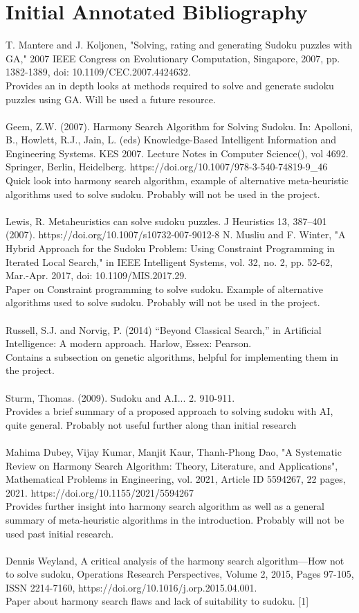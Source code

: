 \documentclass[a4paper,10pt]{article}
\begin{document}
\section*{Initial Annotated Bibliography}
T. Mantere and J. Koljonen, "Solving, rating and generating Sudoku puzzles with GA," 2007 IEEE Congress on Evolutionary Computation, Singapore, 2007, pp. 1382-1389, doi: 10.1109/CEC.2007.4424632. \\Provides an in depth looks at methods required to solve and generate sudoku puzzles using GA. Will be used a future resource.  \\ \\
Geem, Z.W. (2007). Harmony Search Algorithm for Solving Sudoku. In: Apolloni, B., Howlett, R.J., Jain, L. (eds) Knowledge-Based Intelligent Information and Engineering Systems. KES 2007. Lecture Notes in Computer Science(), vol 4692. Springer, Berlin, Heidelberg. https://doi.org/10.1007/978-3-540-74819-9\_46  \\Quick look into harmony search algorithm, example of alternative meta-heuristic algorithms used to solve sudoku. Probably will not be used in the project. \\ \\
Lewis, R. Metaheuristics can solve sudoku puzzles. J Heuristics 13, 387–401 (2007). https://doi.org/10.1007/s10732-007-9012-8
N. Musliu and F. Winter, "A Hybrid Approach for the Sudoku Problem: Using Constraint Programming in Iterated Local Search," in IEEE Intelligent Systems, vol. 32, no. 2, pp. 52-62, Mar.-Apr. 2017, doi: 10.1109/MIS.2017.29. \\Paper on Constraint programming to solve sudoku. Example of alternative algorithms used to solve sudoku. Probably will not be used in the project. \\ \\
Russell, S.J. and Norvig, P. (2014) “Beyond Classical Search,” in Artificial Intelligence: A modern approach. Harlow, Essex: Pearson. \\ Contains a subsection on genetic algorithms, helpful for implementing them in the project. \\ \\
Sturm, Thomas. (2009). Sudoku and A.I... 2. 910-911. \\ Provides a brief summary of a proposed approach to solving sudoku with AI, quite general. Probably not useful further along than initial research \\ \\
Mahima Dubey, Vijay Kumar, Manjit Kaur, Thanh-Phong Dao, "A Systematic Review on Harmony Search Algorithm: Theory, Literature, and Applications", Mathematical Problems in Engineering, vol. 2021, Article ID 5594267, 22 pages, 2021. https://doi.org/10.1155/2021/5594267 \\ Provides further insight into harmony search algorithm as well as a general summary of meta-heuristic algorithms in the introduction. Probably will not be used past initial research. \\ \\
Dennis Weyland, A critical analysis of the harmony search algorithm—How not to solve sudoku, Operations Research Perspectives, Volume 2, 2015, Pages 97-105, ISSN 2214-7160, https://doi.org/10.1016/j.orp.2015.04.001.\\ Paper about harmony search flaws and lack of suitability to sudoku. [1]
\end{document}
